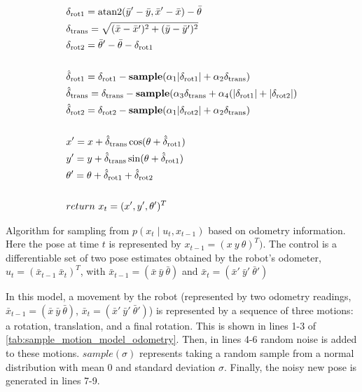 \documentclass[thesis.tex]{subfile}
\begin{document}
\begin{table}[htbp]
\centering
\begin{align}
&\delta_{\text{rot1}} = \text{atan2}(\bar{y}' - \bar{y}, \bar{x}' - \bar{x}) - \bar{\theta}\\ 
&\delta_{\text{trans}} = \sqrt{(\bar{x} - \bar{x}')^2 + (\bar{y} - \bar{y}')^2}\\
&\delta_{\text{rot2}} = \bar{\theta}' - \bar{\theta} - \delta_{\text{rot1}}\\
\notag \\
&\hat{\delta}_{\text{rot1}} = \delta_{\text{rot1}} - \textbf{sample}(\alpha_1\lvert\delta_{\text{rot1}}\rvert + \alpha_2\delta_{\text{trans}})\\
&\hat{\delta}_{\text{trans}} = \delta_{\text{trans}} - \textbf{sample}(\alpha_3\delta_{\text{trans}} + \alpha_4(\lvert\delta_{\text{rot1}}\rvert + \lvert\delta_{\text{rot2}}\rvert)\\
&\hat{\delta}_{\text{rot2}} = \delta_{\text{rot2}} - \textbf{sample}(\alpha_1\lvert\delta_{\text{rot2}}\rvert + \alpha_2\delta_{\text{trans}})\\
\notag \\
&x' = x + \hat{\delta}_{\text{trans}}\cos(\theta + \hat{\delta}_{\text{rot1}})\\
&y' = y + \hat{\delta}_{\text{trans}}\sin(\theta + \hat{\delta}_{\text{rot1}})\\
&\theta' = \theta + \hat{\delta}_{\text{rot1}} + \hat{\delta}_{\text{rot2}}\\
\notag \\
&return \ x_t = (x', y', \theta')^T
\end{align}
\caption[Algorithm sample\_motion\_model\_odometry]{Algorithm for sampling from $p(x_t \mid u_t, x_{t-1})$ based on odometry information. Here the pose at time $t$ is represented by $x_{t-1} = (x\ y\ \theta)^T)$. The control is a differentiable set of two pose estimates obtained by the robot's odometer, $u_t = (\bar{x}_{t-1}\ \bar{x}_t)^T$, with $\bar{x}_{t-1} = (\bar{x}\ \bar{y}\ \bar{\theta})$ and $\bar{x}_{t} = (\bar{x}'\ \bar{y}'\ \bar{\theta}')$}
\label{tab:sample_motion_model_odometry}
\end{table} 

In this model, a movement by the robot (represented by two odometry readings, $\bar{x}_{t-1} = (\bar{x}\ \bar{y}\ \bar{\theta})$, $\bar{x}_{t} = (\bar{x}'\ \bar{y}'\ \bar{\theta}')$) is represented by a sequence of three motions: a rotation, translation, and a final rotation. This is shown in lines 1-3 of \cref{tab:sample_motion_model_odometry}. Then, in lines 4-6 random noise is added to these motions. $sample(\sigma)$ represents taking a random sample from a normal distribution with mean 0 and standard deviation $\sigma$. Finally, the noisy new pose is generated in lines 7-9.
\end{document}
